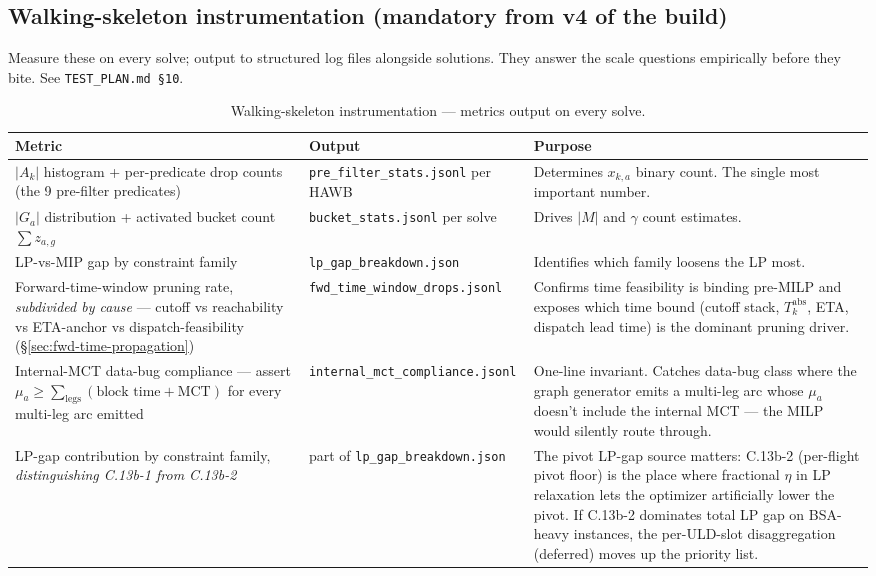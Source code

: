\documentclass[11pt,a4paper]{article}
\theoremstyle{definition}
\begin{document}
\subsection*{Walking-skeleton instrumentation (mandatory from v4 of the build)}
\label{sec:walking-skeleton-instrumentation}

Measure these on every solve; output to structured log files alongside
solutions. They answer the scale questions empirically before they bite.
See \texttt{TEST\_PLAN.md \S10}.

\begin{table}[H]
\centering
\small
\caption{Walking-skeleton instrumentation --- metrics output on every solve.}
\label{tab:walking-skeleton-metrics}
\begin{tabular}{p{4.7cm}p{4.0cm}p{6.2cm}}
\toprule
Metric & Output & Purpose \\
\midrule
$|A_k|$ histogram + per-predicate drop counts (the 9 pre-filter predicates) & \texttt{pre\_filter\_stats.jsonl} per HAWB & Determines $x_{k,a}$ binary count. The single most important number. \\
$|G_a|$ distribution + activated bucket count $\sum z_{a,g}$ & \texttt{bucket\_stats.jsonl} per solve & Drives $|M|$ and $\gamma$ count estimates. \\
LP-vs-MIP gap by constraint family & \texttt{lp\_gap\_breakdown.json} & Identifies which family loosens the LP most. \\
Forward-time-window pruning rate, \emph{subdivided by cause} --- cutoff vs reachability vs ETA-anchor vs dispatch-feasibility (\S\ref{sec:fwd-time-propagation}) & \texttt{fwd\_time\_window\_drops.jsonl} & Confirms time feasibility is binding pre-MILP and exposes which time bound (cutoff stack, $T_k^{\text{abs}}$, ETA, dispatch lead time) is the dominant pruning driver. \\
Internal-MCT data-bug compliance --- assert $\mu_a \geq \sum_{\text{legs}} (\text{block time} + \text{MCT})$ for every multi-leg arc emitted & \texttt{internal\_mct\_compliance.jsonl} & One-line invariant. Catches data-bug class where the graph generator emits a multi-leg arc whose $\mu_a$ doesn't include the internal MCT --- the MILP would silently route through. \\
LP-gap contribution by constraint family, \emph{distinguishing C.13b-1 from C.13b-2} & part of \texttt{lp\_gap\_breakdown.json} & The pivot LP-gap source matters: C.13b-2 (per-flight pivot floor) is the place where fractional $\eta$ in LP relaxation lets the optimizer artificially lower the pivot. If C.13b-2 dominates total LP gap on BSA-heavy instances, the per-ULD-slot disaggregation (deferred) moves up the priority list. \\

\end{tabular}
\end{table}
\end{document}
